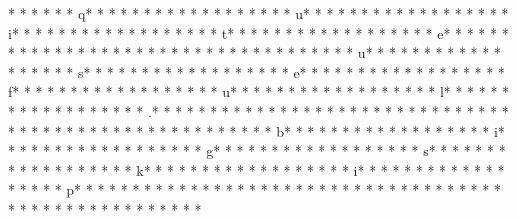 *  *  * * *  * q* * *  * * *  * * *  *  * * *  *  * * *  * u* * *  * * *  * * *  *  * * *  *  * * *  * i* * *  * * *  * * *  *  * * *  *  * * *  * t* * *  * * *  * * *  *  * * *  *  * * *  * e* * *  * * *  * * *  *  * * *  *  * * *  *  * * *  * * *  * * *  *  * * *  *  * * *  * u* * *  * * *  * * *  *  * * *  *  * * *  * s* * *  * * *  * * *  *  * * *  *  * * *  * e* * *  * * *  * * *  *  * * *  *  * * *  * f* * *  * * *  * * *  *  * * *  *  * * *  * u* * *  * * *  * * *  *  * * *  *  * * *  * l* * *  * * *  * * *  *  * * *  *  * * *  * .* * *  * * *  * * *  *  * * *  *  * * *  * 
* * *  * * *  * * *  *  * * *  *  * * *  * 	* * *  * * *  * * *  *  * * *  *  * * *  * b* * *  * * *  * * *  *  * * *  *  * * *  * i* * *  * * *  * * *  *  * * *  *  * * *  * g* * *  * * *  * * *  *  * * *  *  * * *  * s* * *  * * *  * * *  *  * * *  *  * * *  * k* * *  * * *  * * *  *  * * *  *  * * *  * i* * *  * * *  * * *  *  * * *  *  * * *  * p* * *  * * *  * * *  *  * * *  *  * * *  * 
* * *  * * *  * * *  *  * * *  *  * * *  * 	* * *  * * *  * * *  *  * * *  *  * * *  * 

